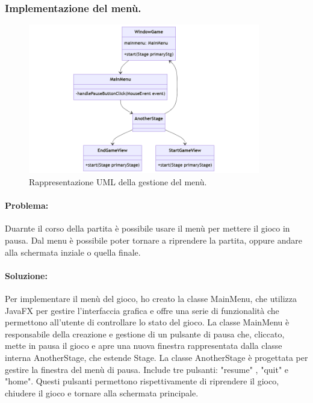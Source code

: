 \documentclass[a4paper,12pt]{report}
\begin{document}
\subsubsection{Implementazione del menù.}

\begin{figure}[H]
\centering{}
\includegraphics[width=0.9\textwidth]{img/mainmenu.png}
\caption{Rappresentazione UML della gestione del menù.}
\end{figure}

\paragraph{Problema:}
Duarnte il corso della partita è possibile usare il menù per mettere il gioco in pausa. 
Dal menu è possibile poter tornare a riprendere la partita, oppure andare alla schermata inziale o quella finale.

\paragraph{Soluzione:}
Per implementare il menù del gioco, ho creato la classe MainMenu, che utilizza JavaFX per gestire l'interfaccia grafica e offre una serie di funzionalità che permettono all'utente di controllare lo stato del gioco. 
La classe MainMenu è responsabile della creazione e gestione di un pulsante di pausa che, cliccato, mette in pausa il gioco e apre una nuova finestra rappresentata dalla classe interna AnotherStage, che estende Stage. 
La classe AnotherStage è progettata per gestire la finestra del menù di pausa. 
Include tre pulsanti: "resume" , "quit" e "home". 
Questi pulsanti permettono rispettivamente di riprendere il gioco, chiudere il gioco e tornare alla schermata principale. 
\end{document}
